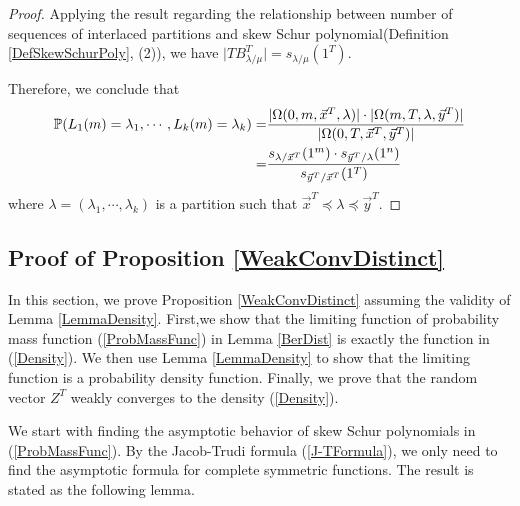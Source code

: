 \begin{proof}
Applying the result regarding the relationship between number of sequences of interlaced partitions and skew Schur polynomial(Definition \ref{DefSkewSchurPoly}, (2)), we have $\lvert TB_{\lambda/\mu}^T\rvert =s_{\lambda/\mu}(1^T)$.

Therefore, we conclude that 
\begin{align*}
\mathbb{P}(L_1(m)=\lambda_1,\cdots, L_k(m)=\lambda_k)
=&{}\frac{\lvert \Omega(0, m, \vec{x}^T, \lambda)\rvert\cdot \lvert \Omega(m, T, \lambda, \vec{y}^T)\rvert}{\lvert \Omega(0, T, \vec{x}^T, \vec{y}^T)\rvert}\\
=&{}\frac{s_{\lambda/\vec{x}^T}(1^{m})\cdot s_{\vec{y}^T/\lambda}(1^{n})}{s_{\vec{y}^T/\vec{x}^T}(1^T)}
\end{align*} where $\lambda=(\lambda_{1},\cdots,\lambda_{k})$ is a partition such that $\vec{x}^{T}\preceq\lambda\preceq\vec{y}^{T}$.
\end{proof}

\subsection{Proof of Proposition \ref{WeakConvDistinct}}{\label{ProofProp1}} In this section, we prove Proposition \ref{WeakConvDistinct} assuming the validity of Lemma \ref{LemmaDensity}. First,we show that the limiting function of probability mass function (\ref{ProbMassFunc}) in Lemma \ref{BerDist} is exactly the function in (\ref{Density}). We then use Lemma \ref{LemmaDensity} to show that the limiting function is a probability density function. Finally, we prove that the random vector $Z^{T}$ weakly converges to the density (\ref{Density}).

We start with finding the asymptotic behavior of skew Schur polynomials in (\ref{ProbMassFunc}). By the Jacob-Trudi formula (\ref{J-TFormula}), we only need to find the asymptotic formula for complete symmetric functions. The result is stated as the following lemma.

